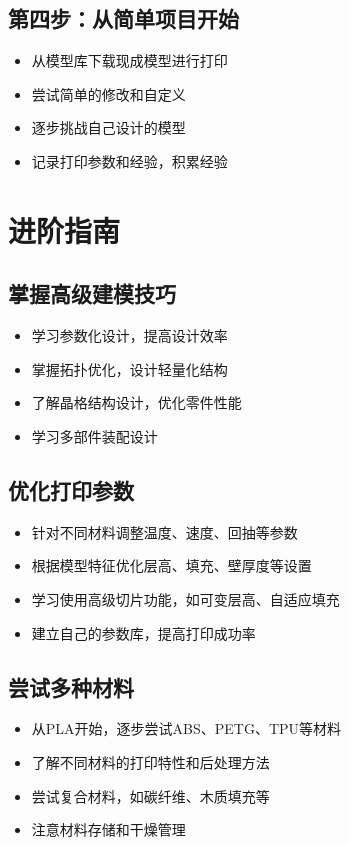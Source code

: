 \documentclass[12pt,UTF8]{ctexbook}
\begin{document}
\subsection{第四步：从简单项目开始}
\begin{itemize}
\item 从模型库下载现成模型进行打印
\item 尝试简单的修改和自定义
\item 逐步挑战自己设计的模型
\item 记录打印参数和经验，积累经验
\end{itemize}

\section{进阶指南}

\subsection{掌握高级建模技巧}
\begin{itemize}
\item 学习参数化设计，提高设计效率
\item 掌握拓扑优化，设计轻量化结构
\item 了解晶格结构设计，优化零件性能
\item 学习多部件装配设计
\end{itemize}

\subsection{优化打印参数}
\begin{itemize}
\item 针对不同材料调整温度、速度、回抽等参数
\item 根据模型特征优化层高、填充、壁厚度等设置
\item 学习使用高级切片功能，如可变层高、自适应填充
\item 建立自己的参数库，提高打印成功率
\end{itemize}

\subsection{尝试多种材料}
\begin{itemize}
\item 从PLA开始，逐步尝试ABS、PETG、TPU等材料
\item 了解不同材料的打印特性和后处理方法
\item 尝试复合材料，如碳纤维、木质填充等
\item 注意材料存储和干燥管理
\end{itemize}
\end{document}

